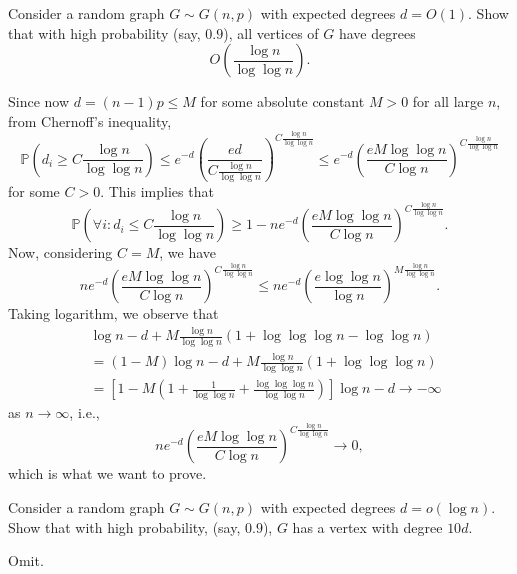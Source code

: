 \begin{problem*}[Exercise 2.4.3]\label{ex2.4.3}
	Consider a random graph \(G \sim G(n, p)\) with expected degrees \(d = O(1)\). Show that with high probability (say, \(0.9\)), all vertices of \(G\) have degrees
	\[
		O\left( \frac{\log n}{\log \log n} \right) .
	\]
\end{problem*}
\begin{answer}
	Since now \(d = (n-1)p \leq M\) for some absolute constant \(M > 0\) for all large \(n\), from Chernoff's inequality,
	\[
		\mathbb{P} \left( d_i \geq C \frac{\log n}{\log \log n} \right)
		\leq e^{-d} \left( \frac{ed}{C \frac{\log n}{\log \log n}} \right) ^{C \frac{\log n}{\log \log n}}
		\leq e^{-d} \left( \frac{e M \log \log n}{C \log n} \right) ^{C \frac{\log n}{\log \log n}}
	\]
	for some \(C > 0\). This implies that
	\[
		\mathbb{P} \left( \forall i \colon d_i \leq C \frac{\log n}{\log \log n} \right)
		\geq 1 - n e^{-d} \left( \frac{e M \log \log n}{C \log n} \right) ^{C \frac{\log n}{\log \log n}}.
	\]
	Now, considering \(C = M\), we have
	\[
		n e^{-d} \left( \frac{e M \log \log n}{C \log n} \right) ^{C \frac{\log n}{\log \log n}}
		\leq n e^{-d} \left( \frac{e \log \log n}{\log n} \right) ^{M \frac{\log n}{\log \log n}}.
	\]
	Taking logarithm, we observe that
	\[
		\begin{split}
			 & \log n - d + M \frac{\log n}{\log \log n} \left( 1 + \log \log \log n - \log \log n\right)                        \\
			 & = (1 - M) \log n - d + M \frac{\log n}{\log \log n} (1 + \log \log \log n)                                        \\
			 & = \left[ 1 - M \left( 1 + \frac{1}{\log \log n} + \frac{\log \log \log n}{\log \log n} \right) \right] \log n - d
			\to -\infty
		\end{split}
	\]
	as \(n \to \infty \), i.e.,
	\[
		n e^{-d} \left( \frac{e M \log \log n}{C \log n} \right) ^{C \frac{\log n}{\log \log n}}
		\to 0,
	\]
	which is what we want to prove.
\end{answer}

\begin{problem*}[Exercise 2.4.4]\label{ex2.4.4}
	Consider a random graph \(G \sim G(n, p)\) with expected degrees \(d = o(\log n)\). Show that with high probability, (say, \(0.9\)), \(G\) has a vertex with degree \(10d\).
\end{problem*}
\begin{answer}
	Omit.
\end{answer}

